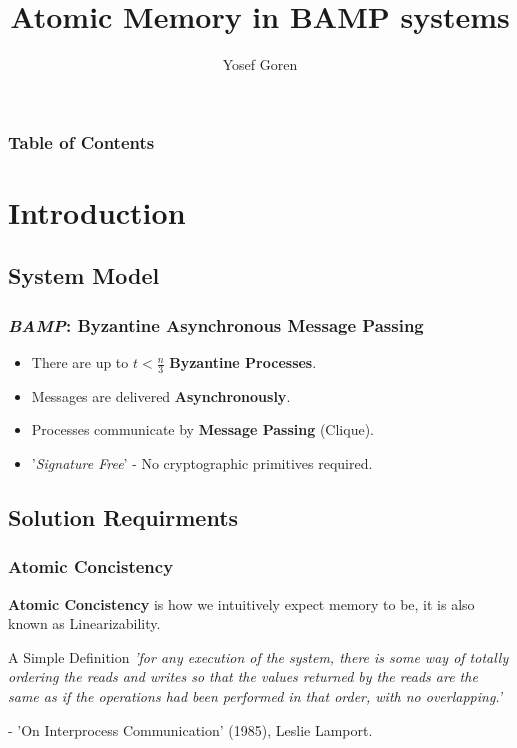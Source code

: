 \documentclass{beamer}
\begin{document}
\title{Atomic Memory in BAMP systems}
\author{Yosef Goren}
\date{}

\begin{frame}
    \frametitle{Table of Contents}
    \tableofcontents
\end{frame}

\section{Introduction}
\subsection{System Model}
\begin{frame}
    \frametitle{\emph{BAMP}: Byzantine Asynchronous Message Passing}
    \begin{itemize}
        \item There are up to $t<\frac{n}{3}$ \textbf{Byzantine Processes}.
        \item Messages are delivered \textbf{Asynchronously}.
        \item Processes communicate by \textbf{Message Passing} (Clique).
        \item '\emph{Signature Free}' - No cryptographic primitives required.
    \end{itemize}
\end{frame}

\subsection{Solution Requirments}
\begin{frame}
    \frametitle{Atomic Concistency}
    \textbf{Atomic Concistency} is how we intuitively expect memory to be,
    it is also known as Linearizability.
    \begin{block}{A Simple Definition}
        \emph{'for any execution of the system, there is some way of totally ordering
        the reads and writes so that the values returned by the reads are the same
        as if the operations had been performed in that order, with no overlapping.'}\\
    \end{block}
    - 'On Interprocess Communication' (1985), Leslie Lamport.
\end{frame}
\end{document}
